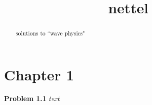 \documentclass{article}
\title{nettel}
\begin{document}
\maketitle
\begin{abstract}
solutions to ``wave physics"
\end{abstract}
\section{Chapter 1}

\noindent \textbf{Problem 1.1} \textit{text}
\end{document}
